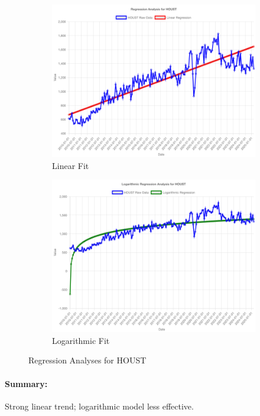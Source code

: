 \documentclass[11pt,a4paper]{article}
\begin{document}
\begin{figure}[htbp]
  \centering
  \begin{subfigure}[b]{0.48\textwidth}
    \includegraphics[width=\textwidth]{backend/analyses/HOUST_analysis.png}
    \caption{Linear Fit}
  \end{subfigure}
  \hfill
  \begin{subfigure}[b]{0.48\textwidth}
    \includegraphics[width=\textwidth]{backend/analyses/HOUST_log_analysis.png}
    \caption{Logarithmic Fit}
  \end{subfigure}
  \caption{Regression Analyses for HOUST}
\end{figure}

\paragraph{Summary:}
Strong linear trend; logarithmic model less effective.
\end{document}
